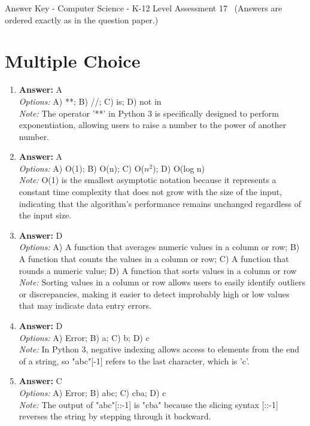 \documentclass[12pt]{article}
\begin{document}
\begin{center}
Answer Key - Computer Science - K-12 Level Assessment 17 \
\small (Answers are ordered exactly as in the question paper.)
\end{center}

\section*{Multiple Choice}
\begin{enumerate}[label=\arabic*.]
\item \textbf{Answer:} A
\\ \textit{Options:} A) **; B) //; C) is; D) not in
\\ \textit{Note:} The operator '**' in Python 3 is specifically designed to perform exponentiation, allowing users to raise a number to the power of another number.
\item \textbf{Answer:} A
\\ \textit{Options:} A) O(1); B) O(n); C) O($n^2$); D) O(log n)
\\ \textit{Note:} O(1) is the smallest asymptotic notation because it represents a constant time complexity that does not grow with the size of the input, indicating that the algorithm's performance remains unchanged regardless of the input size.
\item \textbf{Answer:} D
\\ \textit{Options:} A) A function that averages numeric values in a column or row; B) A function that counts the values in a column or row; C) A function that rounds a numeric value; D) A function that sorts values in a column or row
\\ \textit{Note:} Sorting values in a column or row allows users to easily identify outliers or discrepancies, making it easier to detect improbably high or low values that may indicate data entry errors.
\item \textbf{Answer:} D
\\ \textit{Options:} A) Error; B) a; C) b; D) c
\\ \textit{Note:} In Python 3, negative indexing allows access to elements from the end of a string, so "abc"[-1] refers to the last character, which is 'c'.
\item \textbf{Answer:} C
\\ \textit{Options:} A) Error; B) abc; C) cba; D) c
\\ \textit{Note:} The output of "abc"[::-1] is "cba" because the slicing syntax [::-1] reverses the string by stepping through it backward.
\end{enumerate}
\end{document}
